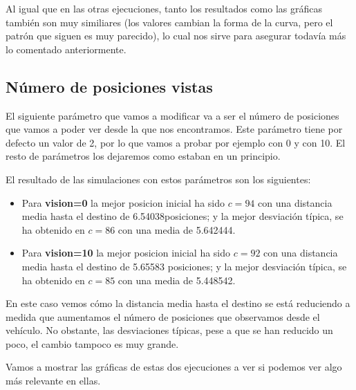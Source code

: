 \documentclass[11pt,a4paper]{report}
\begin{document}
Al igual que en las otras ejecuciones, tanto los resultados como las gráficas también son muy similiares (los valores cambian
la forma de la curva, pero el patrón que siguen es muy parecido), lo cual nos sirve para asegurar todavía más lo comentado
anteriormente.

\subsection{Número de posiciones vistas}

El siguiente parámetro que vamos a modificar va a ser el número de posiciones que vamos a poder ver desde la que nos encontramos.
Este parámetro tiene por defecto un valor de 2, por lo que vamos a probar por ejemplo con 0 y con 10. El resto de parámetros los
dejaremos como estaban en un principio.

El resultado de las simulaciones con estos parámetros son los siguientes:
\begin{itemize}[label=\textbullet]
	\item Para \textbf{vision=0} la mejor posicion inicial ha sido $c=94$ con una distancia media hasta el destino de 6.54038posiciones;
	y la mejor desviación típica, se ha obtenido en $c=86$ con una media de 5.642444.
	\item Para \textbf{vision=10} la mejor posicion inicial ha sido $c=92$ con una distancia media hasta el destino de 5.65583 posiciones;
	y la mejor desviación típica, se ha obtenido en $c=85$ con una media de 5.448542.
\end{itemize}

En este caso vemos cómo la distancia media hasta el destino se está reduciendo a medida que aumentamos el número de posiciones que
observamos desde el vehículo. No obstante, las desviaciones típicas, pese a que se han reducido un poco, el cambio tampoco es muy grande.

Vamos a mostrar las gráficas de estas dos ejecuciones a ver si podemos ver algo más relevante en ellas.
\end{document}
